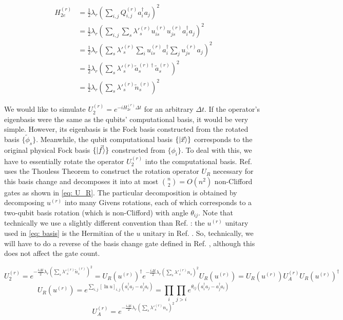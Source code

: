 \begin{equation}
    \begin{split}
        H_{2e}^{(r)} &= \frac{1}{2}\lambda_r\left(\sum_{i,j} Q^{(r)}_{i, j}a^\dag_ia_j\right)^2 \\
        &= \frac{1}{2}\lambda_r\left(\sum_{i,j} \sum_s \lambda'^{(r)}_s u^{(r)}_{is}u^{(r)}_{js}a^\dag_ia_j\right)^2 \\
        &= \frac{1}{2}\lambda_r\left(\sum_s \lambda'^{(r)}_s \sum_i u^{(r)}_{is}a^\dag_i\sum_ju^{(r)}_{js}a_j\right)^2 \\
        &= \frac{1}{2}\lambda_r\left(\sum_s \lambda'^{(r)}_s \tilde{a}^{(r)\dag}_s\tilde{a}^{(r)}_s\right)^2 \\
        &= \frac{1}{2}\lambda_r\left(\sum_s \lambda'^{(r)}_s \tilde{n}^{(r)}_s\right)^2
    \end{split}
\end{equation}

We would like to simulate $U_2^{(r)} = e^{-iH_{2e}^{(r)}\Delta t}$ for an arbitrary $\Delta t$. If the operator's eigenbasis were the same as the qubits' computational basis, it would be very simple. However, its eigenbasis is the Fock basis constructed from the rotated basis $\{\tilde{\phi}_s\}$. Meanwhile, the qubit computational basis $\{\ket{\vec{x}}\}$ corresponds to the original physical Fock basis $\{\ket{\vec{f}}\}$ constructed from $\{\phi_i\}$. To deal with this, we have to essentially rotate the operator $U_2^{(r)}$ into the computational basis. Ref. \cite{FSN} uses the Thouless Theorem to construct the rotation operator $U_R$ necessary for this basis change and decomposes it into at most ${n \choose 2} = O(n^2)$ non-Clifford gates as shown in \eqref{eq: U_R}. The particular decomposition is obtained by decomposing $u^{(r)}$ into many Givens rotations, each of which corresponds to a two-qubit basis rotation (which is non-Clifford) with angle $\theta_{ij}$. Note that technically we use a slightly different convention than Ref. \cite{FSN}: the $u^{(r)}$ unitary used in \eqref{eq: basis} is the Hermitian of the $u$ unitary in Ref. \cite{FSN}. So, technically, we will have to do a reverse of the basis change gate defined in Ref. \cite{FSN}, although this does not affect the gate count.

\begin{equation}
    U_2^{(r)} = e^{-\frac{i\Delta t}{2}\lambda_r\left(\sum_s \lambda'^{(r)}_s \tilde{n}^{(r)}_s\right)^2} = U_R(u^{(r)})^\dag e^{-\frac{i\Delta t}{2}\lambda_r\left(\sum_s \lambda'^{(r)}_s n_s\right)^2}U_R(u^{(r)}) = U_R(u^{(r)}) U_A^{(r)}U_R(u^{(r)})^\dag
    \label{eq: U_2^r}
\end{equation}
\begin{equation}
    U_R(u^{(r)}) = e^{\sum_{i,j} [\ln{u}]_{i,j} (a^\dag_i a_j - a^\dag_j a_i)} = \prod_i \prod_{j > i} e^{\theta_{ij}(a^\dag_i a_j - a^\dag_j a_i)} \label{eq: U_R}
\end{equation}
\begin{equation}
    U_A^{(r)} = e^{-\frac{i\Delta t}{2}\lambda_r\left(\sum_s \lambda'^{(r)}_s n_s\right)^2}
\end{equation}

